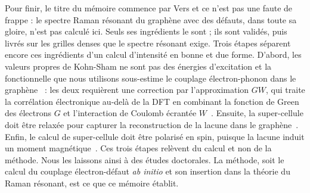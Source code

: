 Pour finir, le titre du mémoire commence par \og Vers \fg{} et ce n'est pas une faute de frappe : le spectre Raman résonant du graphène avec des défauts, dans toute sa gloire, n'est pas calculé ici. Seuls ses ingrédients le sont ; ils sont validés, puis livrés sur les grilles denses que le spectre résonant exige. Trois étapes séparent encore ces ingrédients d'un calcul d'intensité en bonne et due forme. D'abord, les valeurs propres de Kohn-Sham ne sont pas des énergies d'excitation et la fonctionnelle que nous utilisons sous-estime le couplage électron-phonon dans le graphène~\cite{lazzeriImpactElectronelectronCorrelation2008} : les deux requièrent une correction par l'approximation $GW$, qui traite la corrélation électronique au-delà de la DFT en combinant la fonction de Green des électrons $G$ et l'interaction de Coulomb écrantée $W$~\cite{hedinNewMethodCalculating1965}. Ensuite, la super-cellule doit être relaxée pour capturer la reconstruction de la lacune dans le graphène~\cite{el-barbaryStructureEnergeticsVacancy2003,banhartStructuralDefectsGraphene2011}. Enfin, le calcul de super-cellule doit être polarisé en spin, puisque la lacune induit un moment magnétique~\cite{yazyevDefectinducedMagnetismGraphene2007}. Ces trois étapes relèvent du calcul et non de la méthode. Nous les laissons ainsi à des études doctorales. La méthode, soit le calcul du couplage électron-défaut \textit{ab initio} et son insertion dans la théorie du Raman résonant, est ce que ce mémoire établit.